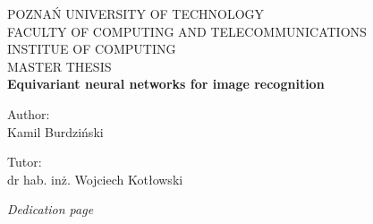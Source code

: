 \documentclass[12pt,a4paper]{article}
\begin{document}
\begin{titlepage}
   \begin{center}
       \vspace*{0.5cm}
POZNAŃ UNIVERSITY OF TECHNOLOGY \\
FACULTY OF COMPUTING AND TELECOMMUNICATIONS \\
       INSTITUE OF COMPUTING \\

       \vspace*{2cm}
       {\Large MASTER THESIS} \\

       \vspace*{1cm}
       \textbf{\Huge Equivariant neural networks for image recognition}  \normalfont \\

       \vspace{5cm}
       \begin{doublespace}
       Author: \\
       {\Large Kamil Burdziński} \\
       \end{doublespace}
       \vspace{4cm}
       \begin{doublespace}
       Tutor:\\
       {\Large dr hab. inż. Wojciech Kotłowski}
       \end{doublespace}
   \end{center}
\end{titlepage}

\cleardoublepage%


\thispagestyle{empty}
\vspace*{\fill}%
\vspace{17cm}
\begin{flushright}
\textit{Dedication page}
\end{flushright}
\vfill\cleardoublepage%

\tableofcontents
\thispagestyle{empty}

\cleardoublepage %

%





\printbibliography

\clearpage
\listoffigures
\listoftables
\end{document}
